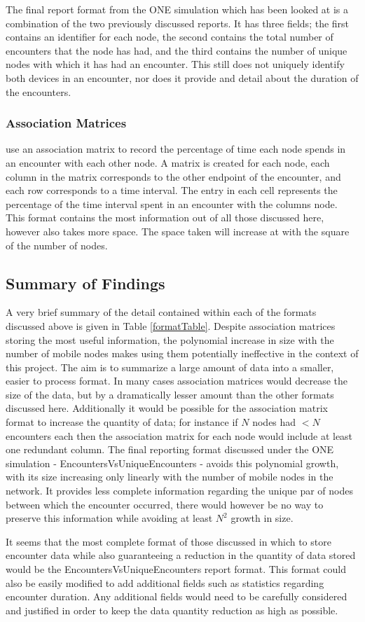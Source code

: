 The final report format from the ONE simulation which has been looked at is a combination of the two previously discussed reports. It has three fields; the first contains an identifier for each node, the second contains the total number of encounters that the node has had, and the third contains the number of unique nodes with which it has had an encounter. This still does not uniquely identify both devices in an encounter, nor does it provide and detail about the duration of the encounters.

\subsubsection{Association Matrices}
\citeauthor{Thakur2012} use an association matrix to record the percentage of time each node spends in an encounter with each other node. A matrix is created for each node, each column in the matrix corresponds to the other endpoint of the encounter, and each row corresponds to a time interval. The entry in each cell represents the percentage of the time interval spent in an encounter with the columns node. This format contains the most information out of all those discussed here, however also takes more space. The space taken will increase at with the square of the number of nodes.



\subsection{Summary of Findings}
A very brief summary of the detail contained within each of the formats discussed above is given in Table \ref{formatTable}. Despite association matrices storing the most useful information, the polynomial increase in size with the number of mobile nodes makes using them potentially ineffective in the context of this project. The aim is to summarize a large amount of data into a smaller, easier to process format. In many cases association matrices would decrease the size of the data, but by a dramatically lesser amount than the other formats discussed here. Additionally it would be possible for the association matrix format to increase the quantity of data; for instance if $N$ nodes had $< N$ encounters each then the association matrix for each node would include at least one redundant column. The final reporting format discussed under the ONE simulation - EncountersVsUniqueEncounters - avoids this polynomial growth, with its size increasing only linearly with the number of mobile nodes in the network. It provides less complete information regarding the unique par of nodes between which the encounter occurred, there would however be no way to preserve this information while avoiding at least $N^{2}$ growth in size.

It seems that the most complete format of those discussed in which to store encounter data while also guaranteeing a reduction in the quantity of data stored would be the EncountersVsUniqueEncounters report format. This format could also be easily modified to add additional fields such as statistics regarding encounter duration. Any additional fields would need to be carefully considered and justified in order to keep the data quantity reduction as high as possible.
